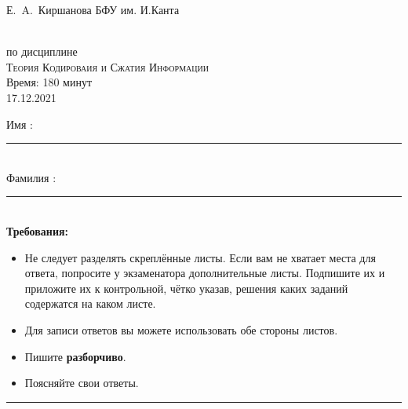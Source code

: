 \documentclass[12pt,a4paper]{scrartcl}
\newcounter{auf}
\begin{document}
Е.\ A.\ Киршанова \hfill БФУ им. И.Канта \\





\begin{center}
  \LARGE
  \\[1ex]
  \Large
  по дисциплине \\[1ex]
  \textsc{Теория Кодироваия и Сжатия Информации}\\[2ex]
  \large
  Время: 180 минут \\
 17.12.2021
\end{center}
\vspace*{1.5cm}


Имя   :\\[-2.2ex] \rule{0.9\textwidth}{.2pt}\\[2ex]
Фамилия : \\ [-2.2ex] \rule{0.9\textwidth}{.2pt}\\[1ex]

\vspace*{1.5cm}
\textbf{Требования:}
\begin{itemize}
  \item Не следует разделять скреплённые листы.  Если вам не хватает места для ответа, попросите у экзаменатора дополнительные листы. Подпишите их и приложите их к контрольной, чётко указав, решения каких заданий содержатся на каком листе.
 \item Для записи ответов вы можете использовать обе стороны листов.
  \item Пишите \textbf{разборчиво}.
  \item Поясняйте свои ответы.
    
    
  
\end{itemize}

\rule{\textwidth}{.2pt}
\vfill
\end{document}
